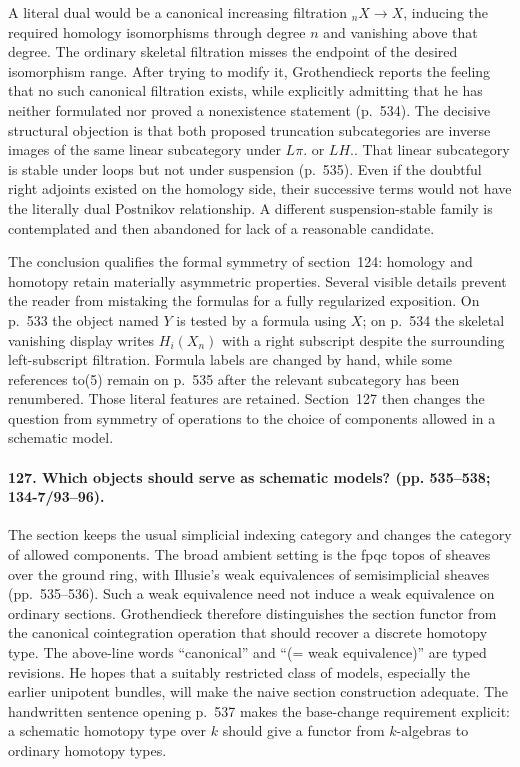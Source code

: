 A literal dual would be a canonical increasing filtration ${}_nX\to X$, inducing the required homology isomorphisms through degree $n$ and vanishing above that degree. The ordinary skeletal filtration misses the endpoint of the desired isomorphism range. After trying to modify it, Grothendieck reports the feeling that no such canonical filtration exists, while explicitly admitting that he has neither formulated nor proved a nonexistence statement (p.~534). The decisive structural objection is that both proposed truncation subcategories are inverse images of the same linear subcategory under $L\pi.$ or $LH.$. That linear subcategory is stable under loops but not under suspension (p.~535). Even if the doubtful right adjoints existed on the homology side, their successive terms would not have the literally dual Postnikov relationship. A different suspension-stable family is contemplated and then abandoned for lack of a reasonable candidate.

The conclusion qualifies the formal symmetry of section~124: homology and homotopy retain materially asymmetric properties. Several visible details prevent the reader from mistaking the formulas for a fully regularized exposition. On p.~533 the object named $Y$ is tested by a formula using $X$; on p.~534 the skeletal vanishing display writes $H_i(X_n)$ with a right subscript despite the surrounding left-subscript filtration. Formula labels are changed by hand, while some references to(5) remain on p.~535 after the relevant subcategory has been renumbered. Those literal features are retained. Section~127 then changes the question from symmetry of operations to the choice of components allowed in a schematic model.

\paragraph{127. Which objects should serve as schematic models? (pp. 535--538; 134-7/93--96).}
The section keeps the usual simplicial indexing category and changes the category of allowed components. The broad ambient setting is the fpqc topos of sheaves over the ground ring, with Illusie's weak equivalences of semisimplicial sheaves (pp.~535--536). Such a weak equivalence need not induce a weak equivalence on ordinary sections. Grothendieck therefore distinguishes the section functor from the canonical cointegration operation that should recover a discrete homotopy type. The above-line words ``canonical'' and ``(= weak equivalence)'' are typed revisions. He hopes that a suitably restricted class of models, especially the earlier unipotent bundles, will make the naive section construction adequate. The handwritten sentence opening p.~537 makes the base-change requirement explicit: a schematic homotopy type over $k$ should give a functor from $k$-algebras to ordinary homotopy types.

